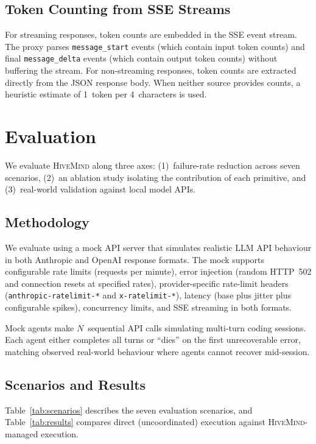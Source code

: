 \documentclass[11pt,twocolumn]{article}
\newcommand{\hm}{\textsc{HiveMind}}
\begin{document}
\subsection{Token Counting from SSE Streams}

For streaming responses, token counts are embedded in the
SSE event stream.  The proxy parses \texttt{message\_start}
events (which contain input token counts) and final
\texttt{message\_delta} events (which contain output token
counts) without buffering the stream.  For non-streaming
responses, token counts are extracted directly from the
JSON response body.  When neither source provides counts,
a heuristic estimate of 1~token per 4~characters is used.

\section{Evaluation}
\label{sec:evaluation}

We evaluate \hm{} along three axes: (1)~failure-rate reduction
across seven scenarios, (2)~an ablation study isolating the
contribution of each primitive, and (3)~real-world validation
against local model APIs.

\subsection{Methodology}

We evaluate using a mock API server that simulates realistic
LLM API behaviour in both Anthropic and OpenAI response formats.
The mock supports configurable rate limits
(requests per minute), error injection (random HTTP~502 and
connection resets at specified rates), provider-specific rate-limit
headers (\texttt{anthropic-ratelimit-*} and \texttt{x-ratelimit-*}),
latency (base plus jitter plus configurable spikes), concurrency
limits, and SSE streaming in both formats.

Mock agents make $N$~sequential API calls simulating multi-turn
coding sessions.  Each agent either completes all turns or
``dies'' on the first unrecoverable error, matching observed
real-world behaviour where agents cannot recover mid-session.

\subsection{Scenarios and Results}

Table~\ref{tab:scenarios} describes the seven evaluation
scenarios, and Table~\ref{tab:results} compares direct
(uncoordinated) execution against \hm{}-managed execution.
\end{document}
